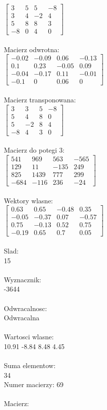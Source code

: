 \documentclass[a4paper,12pt]{article}
\begin{document}
$\begin{bmatrix} 3&5&5&-8\\3&4&-2&4\\5&8&8&3\\-8&0&4&0 \end{bmatrix}$
\\
\\
Macierz odwrotna:\\

$\begin{bmatrix} -0.02&-0.09&0.06&-0.13\\0.1&0.23&-0.05&0.09\\-0.04&-0.17&0.11&-0.01\\-0.1&0&0.06&0 \end{bmatrix}$
\\
\\
Macierz transponowana:\\

$\begin{bmatrix} 3&3&5&-8\\5&4&8&0\\5&-2&8&4\\-8&4&3&0 \end{bmatrix}$
\\
\\
Macierz do potegi 3:\\

$\begin{bmatrix} 541&969&563&-565\\129&11&-135&249\\825&1439&777&299\\-684&-116&236&-24 \end{bmatrix}$
\\
\\
Wektory wlasne:\\

$\begin{bmatrix} 0.63&0.65&-0.48&0.35\\-0.05&-0.37&0.07&-0.57\\0.75&-0.13&0.52&0.75\\-0.19&0.65&0.7&0.05 \end{bmatrix}$
\\
\\
Slad:\\
15
\\
\\
Wyznacznik:\\
-3644
\\
\\
Odwracalnosc:\\
Odwracalna
\\
\\
Wartosci wlasne:\\
10.91 -8.84 8.48 4.45
\\
\\
Suma elementow:\\
34
\\
\newpage
Numer macierzy:
69
\\
\\
Macierz:\\
\end{document}
